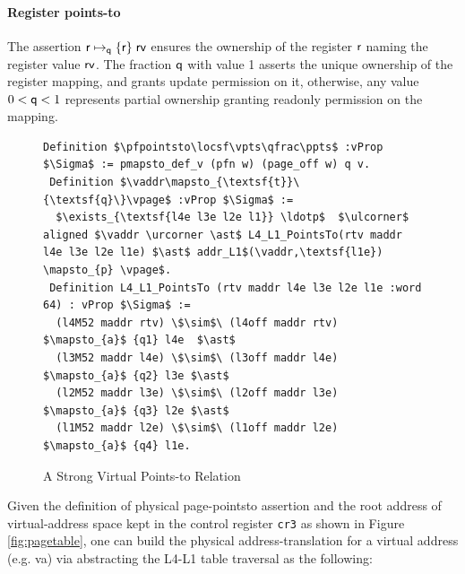 \paragraph{Register points-to} The assertion $\mathsf{r}\mapsto_{\mathsf{q}}\{\mathsf{r}\}\;\mathsf{rv}$ ensures the ownership of the register $\mathsf{r}$ naming the register value $\mathsf{rv}$. The fraction $\mathsf{q}$ with value 1 asserts the unique ownership of the register mapping, and grants update permission on it, otherwise, any value $0 < \mathsf{q} <1$ represents partial ownership granting readonly permission on the mapping.
\begin{figure}
  \begin{lstlisting}[language=Coq]
 Definition $\pfpointsto\locsf\vpts\qfrac\ppts$ :vProp $\Sigma$ := pmapsto_def_v (pfn w) (page_off w) q v.
 Definition $\vaddr\mapsto_{\textsf{t}}\{\textsf{q}\}\vpage$ :vProp $\Sigma$ := 
  $\exists_{\textsf{l4e l3e l2e l1}} \ldotp$  $\ulcorner$ aligned $\vaddr \urcorner \ast$ L4_L1_PointsTo(rtv maddr l4e l3e l2e l1e) $\ast$ addr_L1$(\vaddr,\textsf{l1e}) \mapsto_{p} \vpage$.
 Definition L4_L1_PointsTo (rtv maddr l4e l3e l2e l1e :word 64) : vProp $\Sigma$ :=
  (l4M52 maddr rtv) \$\sim$\ (l4off maddr rtv) $\mapsto_{a}$ {q1} l4e  $\ast$
  (l3M52 maddr l4e) \$\sim$\ (l3off maddr l4e)  $\mapsto_{a}$ {q2} l3e $\ast$ 
  (l2M52 maddr l3e) \$\sim$\ (l2off maddr l3e) $\mapsto_{a}$ {q3} l2e $\ast$
  (l1M52 maddr l2e) \$\sim$\ (l1off maddr l2e) $\mapsto_{a}$ {q4} l1e.
\end{lstlisting}
\caption{A Strong Virtual Points-to Relation}
  \label{fig:strongvirtualpointsto}
\end{figure}
Given the definition of physical page-pointsto assertion and the root address of virtual-address space kept in the control register \lstinline{cr3} as shown in Figure \ref{fig:pagetable},  one can build the physical address-translation for a virtual address (e.g. \textsf{va}) via abstracting the L4-L1 table traversal as the following:
